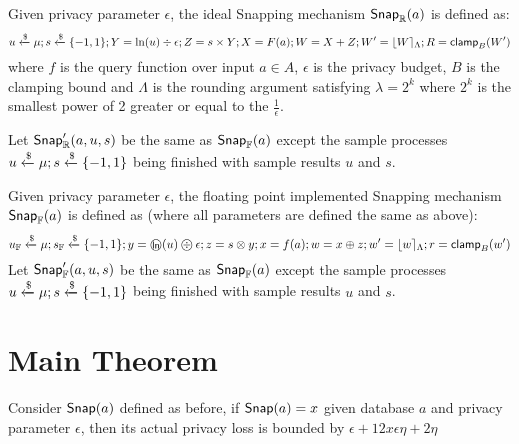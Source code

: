 \documentclass[a4paper,11pt]{article}
\begin{document}
\begin{defn}
Given privacy parameter $\epsilon$, the ideal Snapping mechanism $\mathsf{Snap}_{\mathbb{R}}(a)$ is defined as:
\[
	u \xleftarrow{\$} \mu; s \xleftarrow{\$} \{-1, 1\}; Y = \ln (u) \div \epsilon; Z = s \times Y; X = F(a); W = X + Z; W' = \lfloor W \rceil_{\Lambda}; R = \mathsf{clamp}_B (W')
\]
where $f$ is the query function over input $a \in A$, $\epsilon$ is the privacy budget, $B$ is the clamping bound and $\Lambda$ is the rounding argument satisfying $\lambda = 2^k$ where $2^k$ is the smallest power of 2 greater or equal to the $\frac{1}{\epsilon}$.
%

%
Let $\mathsf{Snap}_{\mathbb{R}}'(a, u, s)$ be the same as $\mathsf{Snap}_{\mathbb{F}}(a)$ except the sample processes $u \xleftarrow{\$} \mu; s \xleftarrow{\$} \{-1, 1\}$ being finished with sample results $u$ and $s$.
\end{defn}


\begin{defn}
Given privacy parameter $\epsilon$, the floating point implemented Snapping mechanism $\mathsf{Snap}_{\mathbb{F}}(a)$ is defined as (where all parameters are defined the same as above):
\[
	u_{\mathbb{F}} \xleftarrow{\$} \edistr; s_{\mathbb{F}} \samplel \{-1, 1\}; y = \oln (u) \odiv \epsilon; z = s \otimes y; x = f(a); w = x \oplus z; w' = \round{w}_{\Lambda}; r = \clamp_B (w')
\]
Let $\mathsf{Snap}_{\mathbb{F}}'(a, u, s)$ be the same as $\mathsf{Snap}_{\mathbb{F}}(a)$ except the sample processes $u \xleftarrow{\$} \mu; s \xleftarrow{\$} \{-1, 1\}$ being finished with sample results $u$ and $s$.
\end{defn}




\section{Main Theorem}

\begin{thm}
Consider $\mathsf{Snap}(a)$ defined as before, if $\mathsf{Snap}(a) = x$ given database $a$ and privacy parameter $\epsilon$, then its actual privacy loss is bounded by $\epsilon + 12 x \epsilon \eta + 2\eta$
\end{thm}
\end{document}
